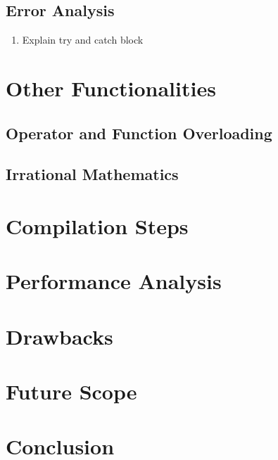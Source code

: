 \documentclass[12pt]{article}
\begin{document}
    \subsection{Error Analysis}
    \begin{enumerate}
        \item Explain try and catch block
    \end{enumerate}

    \section{Other Functionalities}
    \subsection{Operator and Function Overloading}
    \subsection{Irrational Mathematics}


    \section{Compilation Steps}
    \section{Performance Analysis}
    \section{Drawbacks}
    \section{Future Scope}
    \section{Conclusion}
\end{document}
